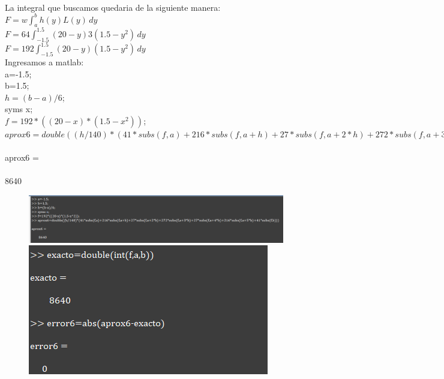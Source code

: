 \documentclass{article}
\theoremstyle{mytheoremstyle}
\theoremstyle{mytheoremstyle}
\theoremstyle{myproblemstyle}
\begin{document}
\noindent \\ La integral que buscamos quedaria de la siguiente manera:  $F= w\int_{a}^{b} h(y)L(y) \,dy$
\\$F= 64\int_{-1.5}^{1.5} (20-y)3(1.5-y^2) \,dy$
\\$F= 192\int_{-1.5}^{1.5} (20-y)(1.5-y^2) \,dy$ 
\\Ingresamos a matlab:
\\ a=-1.5;
\\ b=1.5;
\\$h=(b-a)/6$;
\\ syms x;
\\ $f=192*((20-x)*(1.5-x^2))$;
\\ $aprox6=double((h/140)*(41*subs(f,a)+216*subs(f,a+h)+27*subs(f,a+2*h)+272*subs(f,a+3*h)+27*subs(f,a+4*h)+216*subs(f,a+5*h)+41*subs(f,b)))$
\\
\\aprox6 =
\\
\\        8640
\\
\begin{figure}[ht]
    \includegraphics*[scale=0.55]{img/nc10_2.png}\\
    \includegraphics*[scale=0.8]{img/nc10_3.png}
\end{figure}
\end{document}

